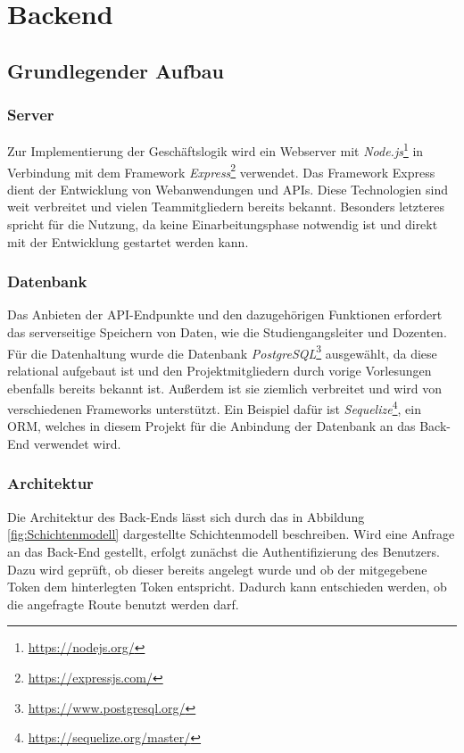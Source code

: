 \section{Backend}
\subsection{Grundlegender Aufbau}
\label{ch:GrundlegenderAufbau}

\subsubsection{Server}
Zur Implementierung der Geschäftslogik wird ein Webserver mit \textit{Node.js}\footnote{\url{https://nodejs.org/}} in Verbindung mit dem Framework \textit{Express}\footnote{\url{https://expressjs.com/}} verwendet.
Das Framework Express dient der Entwicklung von Webanwendungen und \acp{API}.
Diese Technologien sind weit verbreitet und vielen Teammitgliedern bereits bekannt.
Besonders letzteres spricht für die Nutzung, da keine Einarbeitungsphase notwendig ist und direkt mit der Entwicklung gestartet werden kann. 

\subsubsection{Datenbank}
Das Anbieten der \ac{API}-Endpunkte und den dazugehörigen Funktionen erfordert das serverseitige Speichern von Daten, wie die Studiengangsleiter und Dozenten.
Für die Datenhaltung wurde die Datenbank \textit{PostgreSQL}\footnote{\url{https://www.postgresql.org/}} ausgewählt, da diese relational aufgebaut ist und den Projektmitgliedern durch vorige Vorlesungen ebenfalls bereits bekannt ist.
Außerdem ist sie ziemlich verbreitet und wird von verschiedenen Frameworks unterstützt.
Ein Beispiel dafür ist \textit{Sequelize}\footnote{\url{https://sequelize.org/master/}}, ein \ac{ORM}, welches in diesem Projekt für die Anbindung der Datenbank an das Back-End verwendet wird.

\subsubsection{Architektur}
Die Architektur des Back-Ends lässt sich durch das in Abbildung \ref{fig:Schichtenmodell} dargestellte Schichtenmodell beschreiben.
Wird eine Anfrage an das Back-End gestellt, erfolgt zunächst die Authentifizierung des Benutzers.
Dazu wird geprüft, ob dieser bereits angelegt wurde und ob der mitgegebene Token dem hinterlegten Token entspricht.
Dadurch kann entschieden werden, ob die angefragte 
Route benutzt werden darf. 

